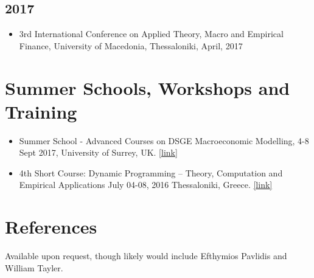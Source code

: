 \documentclass[10pt,]{article}
\providecommand{\tightlist}{%
        \setlength{\itemsep}{0pt}\setlength{\parskip}{0pt}}
\begin{document}
              \hypertarget{section-2}{%
              \subsection{2017}\label{section-2}}
              
              \begin{itemize}
              \tightlist
              \item
                3rd International Conference on Applied Theory, Macro and Empirical
                Finance, University of Macedonia, Thessaloniki, April, 2017
              \end{itemize}
              
              \hypertarget{summer-schools-workshops-and-training}{%
              \section{Summer Schools, Workshops and
              Training}\label{summer-schools-workshops-and-training}}
              
              \begin{itemize}
              \item
                Summer School - Advanced Courses on DSGE Macroeconomic Modelling, 4-8
                Sept 2017, University of Surrey, UK.
                \href{https://www.surrey.ac.uk/events/20180903-foundations-and-advanced-courses-dsge-macroeconomic-modelling-and-conference-summer}{{[}link{]}}
              \item
                4th Short Course: Dynamic Programming -- Theory, Computation and
                Empirical Applications July 04-08, 2016 Thessaloniki, Greece.
                \href{http://sce2016.uom.gr/}{{[}link{]}}
              \end{itemize}
              
              \hypertarget{references}{%
              \section{References}\label{references}}
              
              Available upon request, though likely would include Efthymios Pavlidis
              and William Tayler.
                
                                                                
\end{document}
